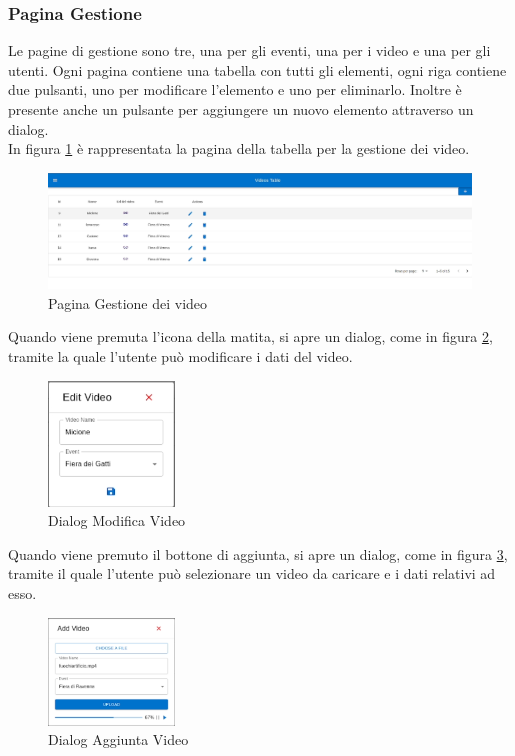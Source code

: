 \subsubsection{Pagina Gestione}
Le pagine di gestione sono tre, una per gli eventi, una per i video e una per gli utenti. Ogni pagina contiene una tabella con tutti gli elementi, ogni riga contiene due pulsanti, uno per modificare l'elemento e uno per eliminarlo. Inoltre è presente anche un pulsante per aggiungere un nuovo elemento attraverso un dialog.\\
In figura \ref{fig:gestionevideo} è rappresentata la pagina della tabella per la gestione dei video.
\begin{figure}[H]
    \centering
    \includegraphics[width=1\textwidth]{images/interface/videotable.png}
    \caption{Pagina Gestione dei video}
    \label{fig:gestionevideo}
\end{figure}
Quando viene premuta l'icona della matita, si apre un dialog, come in figura \ref{fig:modifica video}, tramite la quale l'utente può modificare i dati del video.
\begin{figure}[H]
    \centering
    \includegraphics[width=0.3\textwidth]{images/interface/editvideo.png}
    \caption{Dialog Modifica Video}
    \label{fig:modifica video}
\end{figure}
Quando viene premuto il bottone di aggiunta, si apre un dialog, come in figura \ref{fig:aggiuntavideo}, tramite il quale l'utente può selezionare un video da caricare e i dati relativi ad esso.
\begin{figure}[H]
    \centering
    \includegraphics[width=0.3\textwidth]{images/interface/addvideo.png}
    \caption{Dialog Aggiunta Video}
    \label{fig:aggiuntavideo}
\end{figure}
